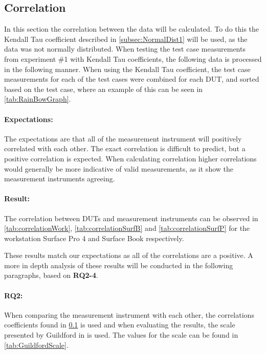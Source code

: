 \subsection{Correlation}\label{subsec:correlation1}
In this section the correlation between the data will be calculated. To do this the Kendall Tau coefficient\cite{kendall1938new} described in \cref{subsec:NormalDist1} will be used, as the data was not normally distributed. When testing the test case measurements from experiment \#1 with Kendall Tau coefficients, the following data is processed in the following manner. When using the Kendall Tau coefficient, the test case measurements for each of the test cases were combined for each DUT, and sorted based on the test case, where an example of this can be seen in \cref{tab:RainBowGraph}.



\paragraph{Expectations:} The expectations are that all of the measurement instrument will positively correlated with each other. The exact correlation is difficult to predict, but a positive correlation is expected. When calculating correlation higher correlations would generally be more indicative of valid measurements, as it show the measurement instruments agreeing.

\paragraph{Result:} The correlation between DUTs and measurement instruments can be observed in \cref{tab:correlationWork},  \cref{tab:correlationSurfB} and \cref{tab:correlationSurfP} for the workstation Surface Pro 4 and Surface Book respectively.




These results match our expectations as all of the correlations are a positive. A more in depth analysis of these results will be conducted in the following paragraphs, based on \textbf{RQ2-4}.

\paragraph{RQ2:} When comparing the measurement instrument with each other, the correlations coefficients found in \cref{subsec:correlation1} is used and when evaluating the results, the scale presented by Guildford in \cite[219]{guilford1950fundamental} is used. The values for the scale can be found in \cref{tab:GuildfordScale}.

